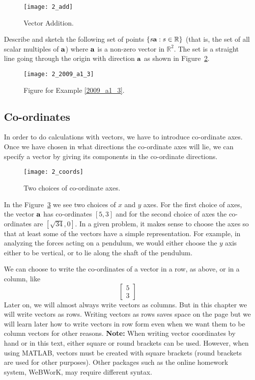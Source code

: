 \begin{figure}
\centerline{\texttt{[image: 2\_add]}}
\caption{Vector Addition. \label{fig_add}}
\end{figure}

\begin{example}
\label{2009_a1_3}
Describe and sketch the following set of points $\{ s {\bf a} :
s \in \mathbb{R} \}$ (that is, the set of all scalar multiples of $\bf a$) where
$\bf a$ is a non-zero vector in $\mathbb{R}^2$. {\rm The set is a straight line 
going through the origin with direction $\bf a$ as shown in 
Figure~\ref{ch2exnew1}.}
\end{example}

\begin{figure}[htb]
\centerline{\texttt{[image: 2\_2009\_a1\_3]}}
\caption{Figure for Example \ref{2009_a1_3}. \label{ch2exnew1}}
\end{figure}

\subsection{Co-ordinates}

In order to do calculations with vectors, we have to introduce
co-ordinate axes.  Once we have chosen in what directions the
co-ordinate axes will lie, we can specify a vector by giving its
components in the co-ordinate directions.

\begin{figure}
\centerline{\texttt{[image: 2\_coords]}}
\caption{Two choices of co-ordinate axes. \label{fig_coords}}
\end{figure}

In the Figure~\ref{fig_coords} 
we see two choices of $x$ and $y$ axes. For the first
choice of axes, the vector $\aa$ has co-ordinates $[5,3]$ and for the
second choice of axes the co-ordinates are $[\sqrt{34},0]$. In a given
problem, it makes sense to choose the axes so that at least some of
the vectors have a simple representation. For example, in analyzing
the forces acting on a pendulum, we would either choose the $y$ axis
either to be vertical, or to lie along the shaft of the pendulum.

We can choose to write the co-ordinates of a vector in a row, as
above, or in a column, like
\[
\left[ \begin{array}{c} 
5 \\ 3 \end{array}
\right]
\]
Later on, we will almost always write vectors as columns. But in this
chapter we will write vectors as rows. Writing vectors as rows saves
space on the page but we will learn later how to write vectors in row
form even when we want them to be column vectors for other reasons. 
{\bf Note:} When writing vector coordinates by hand or in this text, either 
square or round brackets can be used. However, when using MATLAB, 
vectors must be created with square brackets (round brackets are used 
for other purposes). Other packages such as the online homework system, 
WeBWorK, may require different syntax. 

